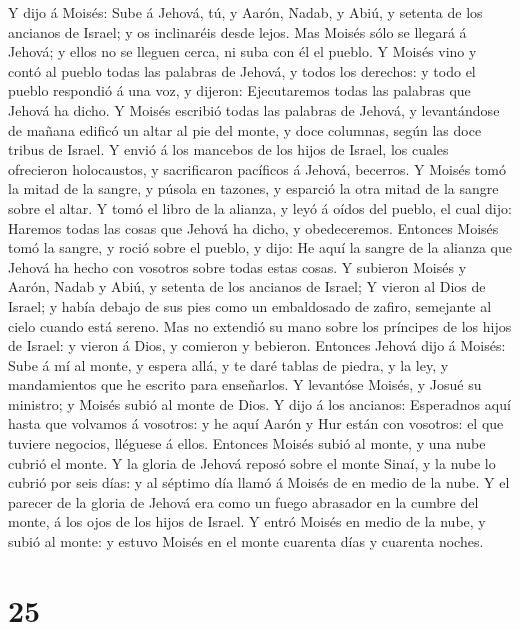  Y dijo á Moisés: Sube á Jehová, tú, y Aarón, Nadab, y
Abiú, y setenta de los ancianos de Israel; y os inclinaréis desde lejos.
 Mas Moisés sólo se llegará á Jehová; y ellos no se
lleguen cerca, ni suba con él el pueblo.  Y Moisés vino y
contó al pueblo todas las palabras de Jehová, y todos los derechos: y
todo el pueblo respondió á una voz, y dijeron: Ejecutaremos todas las
palabras que Jehová ha dicho.  Y Moisés escribió todas las
palabras de Jehová, y levantándose de mañana edificó un altar al pie del
monte, y doce columnas, según las doce tribus de Israel. 
Y envió á los mancebos de los hijos de Israel, los cuales ofrecieron
holocaustos, y sacrificaron pacíficos á Jehová, becerros. 
Y Moisés tomó la mitad de la sangre, y púsola en tazones, y esparció la
otra mitad de la sangre sobre el altar.  Y tomó el libro
de la alianza, y leyó á oídos del pueblo, el cual dijo: Haremos todas
las cosas que Jehová ha dicho, y obedeceremos.  Entonces
Moisés tomó la sangre, y roció sobre el pueblo, y dijo: He aquí la
sangre de la alianza que Jehová ha hecho con vosotros sobre todas estas
cosas.  Y subieron Moisés y Aarón, Nadab y Abiú, y setenta
de los ancianos de Israel;  Y vieron al Dios de Israel; y
había debajo de sus pies como un embaldosado de zafiro, semejante al
cielo cuando está sereno.  Mas no extendió su mano sobre
los príncipes de los hijos de Israel: y vieron á Dios, y comieron y
bebieron.  Entonces Jehová dijo á Moisés: Sube á mí al
monte, y espera allá, y te daré tablas de piedra, y la ley, y
mandamientos que he escrito para enseñarlos.  Y levantóse
Moisés, y Josué su ministro; y Moisés subió al monte de Dios.
 Y dijo á los ancianos: Esperadnos aquí hasta que
volvamos á vosotros: y he aquí Aarón y Hur están con vosotros: el que
tuviere negocios, lléguese á ellos.  Entonces Moisés
subió al monte, y una nube cubrió el monte.  Y la gloria
de Jehová reposó sobre el monte Sinaí, y la nube lo cubrió por seis
días: y al séptimo día llamó á Moisés de en medio de la nube.
 Y el parecer de la gloria de Jehová era como un fuego
abrasador en la cumbre del monte, á los ojos de los hijos de Israel.
 Y entró Moisés en medio de la nube, y subió al monte: y
estuvo Moisés en el monte cuarenta días y cuarenta noches.

\hypertarget{section-24}{%
\section{25}\label{section-24}}

